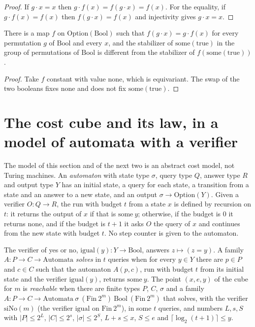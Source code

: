 \begin{proof}
  \leanok
  If $g \cdot x = x$ then $g \cdot f(x) = f(g \cdot x) = f(x)$. For the equality, if
  $g \cdot f(x) = f(x)$ then $f(g \cdot x) = f(x)$ and injectivity gives $g \cdot x = x$.
\end{proof}

\begin{proposition}
  \label{prop:dynamics-curie-strict}
  \leanok
  There is a map $f$ on $\mathrm{Option}(\mathrm{Bool})$ such that
  $f(g \cdot x) = g \cdot f(x)$ for every permutation $g$ of $\mathrm{Bool}$ and every $x$, and
  the stabilizer of $\mathrm{some}(\mathrm{true})$ in the group of permutations of $\mathrm{Bool}$
  is different from the stabilizer of $f(\mathrm{some}(\mathrm{true}))$.
  \own{}
\end{proposition}

\begin{proof}
  \leanok
  Take $f$ constant with value $\mathrm{none}$, which is equivariant. The swap of the two booleans
  fixes $\mathrm{none}$ and does not fix $\mathrm{some}(\mathrm{true})$.
\end{proof}

\section{The cost cube and its law, in a model of automata with a verifier}
\label{sec:dynamics-cube}

The model of this section and of the next two is an abstract cost model, not Turing machines. An
\emph{automaton} with state type $\sigma$, query type $Q$, answer type $R$ and output type $Y$ has
an initial state, a query for each state, a transition from a state and an answer to a new state, and
an output $\sigma \to \mathrm{Option}(Y)$. Given a verifier $O : Q \to R$, the run with budget $t$
from a state $x$ is defined by recursion on $t$: it returns the output of $x$ if that is
$\mathrm{some}\ y$; otherwise, if the budget is $0$ it returns $\mathrm{none}$, and if the budget is
$t + 1$ it asks $O$ the query of $x$ and continues from the new state with budget $t$. No step
counter is given to the automaton.

The verifier of yes or no, $\mathrm{igual}(y) : Y \to \mathrm{Bool}$, answers $z \mapsto
(z = y)$. A family $A : P \to C \to \mathrm{Automata}$ \emph{solves} in $t$ queries when for every
$y \in Y$ there are $p \in P$ and $c \in C$ such that the automaton $A(p, c)$, run with budget $t$
from its initial state and the verifier $\mathrm{igual}(y)$, returns $\mathrm{some}\ y$. The point
$(x, e, y)$ of the cube for $m$ is \emph{reachable} when there are finite types $P$, $C$, $\sigma$
and a family $A : P \to C \to \mathrm{Automata}\ \sigma\ (\mathrm{Fin}\ 2^m)\ \mathrm{Bool}\
(\mathrm{Fin}\ 2^m)$ that solves, with the verifier $\mathrm{siNo}(m)$ (the verifier
$\mathrm{igual}$ on $\mathrm{Fin}\ 2^m$), in some $t$ queries, and numbers $L, s, S$ with
$|P| \le 2^L$, $|C| \le 2^s$, $|\sigma| \le 2^S$, $L + s \le x$, $S \le e$ and
$\lceil \log_2 (t+1) \rceil \le y$.

